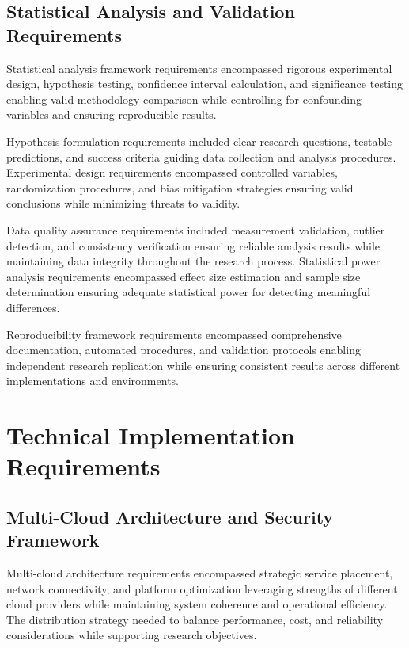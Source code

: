 \subsection{Statistical Analysis and Validation Requirements}

Statistical analysis framework requirements encompassed rigorous experimental design, hypothesis testing, confidence interval calculation, and significance testing enabling valid methodology comparison while controlling for confounding variables and ensuring reproducible results.

Hypothesis formulation requirements included clear research questions, testable predictions, and success criteria guiding data collection and analysis procedures. Experimental design requirements encompassed controlled variables, randomization procedures, and bias mitigation strategies ensuring valid conclusions while minimizing threats to validity.


Data quality assurance requirements included measurement validation, outlier detection, and consistency verification ensuring reliable analysis results while maintaining data integrity throughout the research process. Statistical power analysis requirements encompassed effect size estimation and sample size determination ensuring adequate statistical power for detecting meaningful differences.

Reproducibility framework requirements encompassed comprehensive documentation, automated procedures, and validation protocols enabling independent research replication while ensuring consistent results across different implementations and environments.

\section{Technical Implementation Requirements}

\subsection{Multi-Cloud Architecture and Security Framework}

Multi-cloud architecture requirements encompassed strategic service placement, network connectivity, and platform optimization leveraging strengths of different cloud providers while maintaining system coherence and operational efficiency. The distribution strategy needed to balance performance, cost, and reliability considerations while supporting research objectives.

